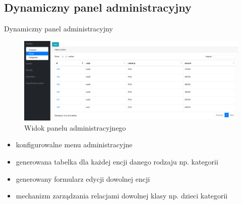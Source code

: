 \documentclass[polish,xcolor=table,9pt,aspectratio=1610,hyperref={pdfpagemode=FullScreen}]{beamer}
\begin{document}
\subsection{Dynamiczny panel administracyjny}
\begin{frame}{Dynamiczny panel administracyjny}
\begin{figure}
	\begin{center}
		\includegraphics[scale=0.18]{admin-main.png}
	\end{center}
	\caption{{\color{black}Widok panelu administracyjnego}} 
\end{figure}
	\begin{itemize}
		\item<1-> konfigurowalne menu administracyjne
		\item<1-> generowana tabelka dla każdej encji danego rodzaju np. kategorii 
		\item<1-> generowany formularz edycji dowolnej encji
		\item<1-> mechanizm zarządzania relacjami dowolnej klasy np. dzieci kategorii
	\end{itemize}
\end{frame}
\end{document}
